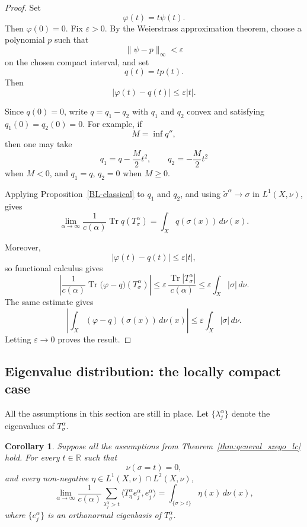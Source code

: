 \documentclass{amsart}
\newtheorem{cor}[thm]{Corollary}
\theoremstyle{definition}
\theoremstyle{remark}
\numberwithin{equation}{section}
\begin{document}
\begin{proof}
Set
\[
\varphi(t)=t\psi(t).
\]
Then $\varphi(0)=0$. Fix $\varepsilon>0$. By the Weierstrass
approximation theorem, choose a polynomial $p$ such that
\[
\|\psi-p\|_\infty<\varepsilon
\]
on the chosen compact interval, and set
\[
q(t)=t p(t).
\]
Then
\[
|\varphi(t)-q(t)|\leq \varepsilon |t|.
\]

Since $q(0)=0$, write $q=q_1-q_2$ with $q_1$ and $q_2$
convex and satisfying $q_1(0)=q_2(0)=0$. For example, if
\[
M=\inf q'',
\]
then one may take
\[
q_1=q-\frac{M}{2}t^2,
\qquad
q_2=-\frac{M}{2}t^2
\]
when $M<0$, and $q_1=q$, $q_2=0$ when $M\geq0$.

Applying Proposition~\ref{BL-classical} to $q_1$ and $q_2$, and using
$\widetilde{\sigma}^{\alpha}\to\sigma$ in $L^1(X,\nu)$, gives
\[
\lim_{\alpha\to\infty}
\frac{1}{c(\alpha)}
\operatorname{Tr}q(T_\sigma^\alpha)
=
\int_X q(\sigma(x))\,d\nu(x).
\]

Moreover,
\[
\left|\varphi(t)-q(t)\right|\leq\varepsilon |t|,
\]
so functional calculus gives
\[
\left|
\frac{1}{c(\alpha)}
\operatorname{Tr}
\bigl(\varphi-q\bigr)(T_\sigma^\alpha)
\right|
\leq
\varepsilon\,
\frac{\operatorname{Tr}|T_\sigma^\alpha|}{c(\alpha)}
\leq
\varepsilon\int_X|\sigma|\,d\nu.
\]
The same estimate gives
\[
\left|
\int_X(\varphi-q)(\sigma(x))\,d\nu(x)
\right|
\leq
\varepsilon\int_X|\sigma|\,d\nu.
\]
Letting $\varepsilon\to0$ proves the result.
\end{proof}

\subsection{Eigenvalue distribution: the locally compact case} All the assumptions in this section are still in place. Let $\{\lambda_j^\alpha\}$ denote the eigenvalues of $T_\sigma^\alpha$.

\begin{cor}\label{eigenvalue} Suppose all the assumptions from Theorem~\ref{thm:general_szego_lc} hold. For every $t\in\mathbb R$ such that
\[
\nu(\sigma=t)=0,
\]
and every non-negative $\eta\in L^1(X,\nu)\cap L^2(X,\nu)$,
\[
\lim_{\alpha\to\infty}
\frac{1}{c(\alpha)}
\sum_{\lambda_j^\alpha>t}
\langle T_\eta^\alpha e_j^\alpha,e_j^\alpha\rangle
=
\int_{\{\sigma>t\}} \eta(x)\, d\nu(x),
\]
where $\{e_j^\alpha\}$ is an orthonormal eigenbasis of $T_\sigma^\alpha$.
\end{cor}
\end{document}
